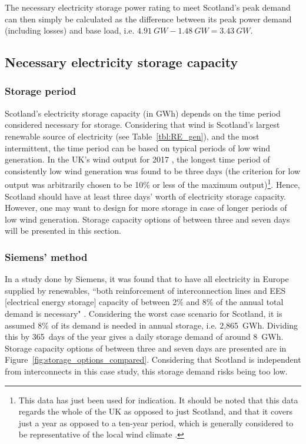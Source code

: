 The necessary electricity storage power rating to meet Scotland's peak demand can then simply be calculated as the difference between its peak power demand (including losses) and base load, i.e. $4.91~GW - 1.48~GW = 3.43~GW$.




\subsection{Necessary electricity storage capacity}

\subsubsection{Storage period}

Scotland's electricity storage capacity (in GWh) depends on the time period considered necessary for storage.
Considering that wind is Scotland's largest renewable source of electricity (see Table~\ref{tbl:RE_gen}), and the most intermittent, the time period can be based on typical periods of low wind generation.
In the UK's wind output for 2017 \citep{GridWatchnd}, the longest time period of consistently low wind generation was found to be three days (the criterion for low output was arbitrarily chosen to be 10\% or less of the maximum output)\footnote{This data has just been used for indication. It should be noted that this data regards the whole of the UK as opposed to just Scotland, and that it covers just a year as opposed to a ten-year period, which is generally considered to be representative of the local wind climate \citep[p.~15]{Boehme2006}.}.
Hence, Scotland should have at least three days' worth of electricity storage capacity.
However, one may want to design for more storage in case of longer periods of low wind generation.
Storage capacity options of between three and seven days will be presented in this section.






\subsubsection{Siemens' method}

In a study done by Siemens, it was found that to have all electricity in Europe supplied by renewables, ``both reinforcement of interconnection lines and EES [electrical energy storage] capacity of between 2\% and 8\% of the annual total demand is necessary" \citep[p.~69]{IEC2011}.
Considering the worst case scenario for Scotland, it is assumed 8\% of its demand is needed in annual storage, i.e. 2,865~GWh.
Dividing this by 365~days of the year gives a daily storage demand of around 8~GWh.
Storage capacity options of between three and seven days are presented are in Figure~\ref{fig:storage_options_compared}.
Considering that Scotland is independent from interconnects in this case study, this storage demand risks being too low.



